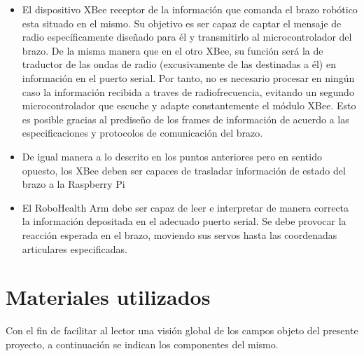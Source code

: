 \begin{itemize}
\item El dispositivo XBee receptor de la información que comanda el brazo robótico esta situado en el mismo. Su objetivo es ser capaz de captar el mensaje de radio específicamente diseñado para él y transmitirlo al microcontrolador del brazo. De la misma manera que en el otro XBee, su función será la de traductor de las ondas de radio (excusivamente de las destinadas a él) en información en el puerto serial. Por tanto, no es necesario procesar en ningún caso la información recibida a traves de radiofrecuencia, evitando un segundo microcontrolador que escuche y adapte constantemente el módulo XBee. Esto es posible gracias al prediseño de los frames de información de acuerdo a las especificaciones y protocolos de comunicación del brazo. 

\item De igual manera a lo descrito en los puntos anteriores pero en sentido opuesto, los XBee deben ser capaces de trasladar información de estado del brazo a la Raspberry Pi

\item El RoboHealth Arm debe ser capaz de leer e interpretar de manera correcta la información depositada en el adecuado puerto serial. Se debe provocar la reacción esperada en el brazo, moviendo sus servos hasta las coordenadas articulares especificadas.

\end{itemize}


\section{Materiales utilizados}

Con el fin de facilitar al lector una visión global de los campos objeto del presente proyecto, a continuación se indican los componentes del mismo.

